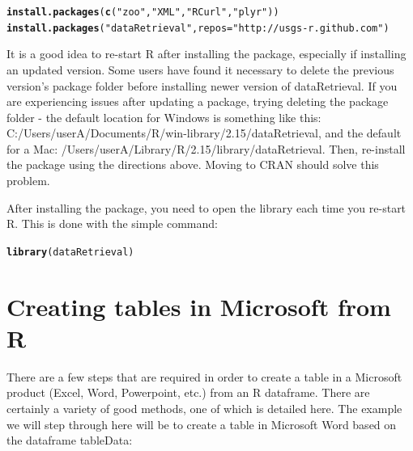 \documentclass[a4paper,11pt]{article}\usepackage[]{graphicx}\usepackage[]{color}
\makeatletter
\newcommand{\hlstr}[1]{\textcolor[rgb]{0.192,0.494,0.8}{#1}}%
\newcommand{\hlstd}[1]{\textcolor[rgb]{0.345,0.345,0.345}{#1}}%
\newcommand{\hlkwc}[1]{\textcolor[rgb]{0.333,0.667,0.333}{#1}}%
\newcommand{\hlkwd}[1]{\textcolor[rgb]{0.737,0.353,0.396}{\textbf{#1}}}%
\newenvironment{kframe}{%
 \def\at@end@of@kframe{}%
 \ifinner\ifhmode%
  \def\at@end@of@kframe{\end{minipage}}%
  \begin{minipage}{\columnwidth}%
 \fi\fi%
 \def\FrameCommand##1{\hskip\@totalleftmargin \hskip-\fboxsep
 \colorbox{shadecolor}{##1}\hskip-\fboxsep
     \hskip-\linewidth \hskip-\@totalleftmargin \hskip\columnwidth}%
 \MakeFramed {\advance\hsize-\width
   \@totalleftmargin\z@ \linewidth\hsize
   \@setminipage}}%
 {\par\unskip\endMakeFramed%
 \at@end@of@kframe}
\newenvironment{knitrout}{}{} %
\makeatother
\begin{document}
\begin{knitrout}
\color{fgcolor}\begin{kframe}
\begin{alltt}
\hlkwd{install.packages}\hlstd{(}\hlkwd{c}\hlstd{(}\hlstr{"zoo"}\hlstd{,}\hlstr{"XML"}\hlstd{,}\hlstr{"RCurl"}\hlstd{,}\hlstr{"plyr"}\hlstd{))}
\hlkwd{install.packages}\hlstd{(}\hlstr{"dataRetrieval"}\hlstd{,} \hlkwc{repos}\hlstd{=}\hlstr{"http://usgs-r.github.com"}\hlstd{)}
\end{alltt}
\end{kframe}
\end{knitrout}


It is a good idea to re-start R after installing the package, especially if installing an updated version. Some users have found it necessary to delete the previous version's package folder before installing newer version of dataRetrieval. If you are experiencing issues after updating a package, trying deleting the package folder - the default location for Windows is something like this: C:/Users/userA/Documents/R/win-library/2.15/dataRetrieval, and the default for a Mac: /Users/userA/Library/R/2.15/library/dataRetrieval. Then, re-install the package using the directions above. Moving to CRAN should solve this problem.

After installing the package, you need to open the library each time you re-start R.  This is done with the simple command:
\begin{knitrout}
\color{fgcolor}\begin{kframe}
\begin{alltt}
\hlkwd{library}\hlstd{(dataRetrieval)}
\end{alltt}
\end{kframe}
\end{knitrout}



\section{Creating tables in Microsoft from R}
\label{app:createWordTable}
There are a few steps that are required in order to create a table in a Microsoft product (Excel, Word, Powerpoint, etc.) from an R dataframe. There are certainly a variety of good methods, one of which is detailed here. The example we will step through here will be to create a table in Microsoft Word based on the dataframe tableData:
\end{document}
